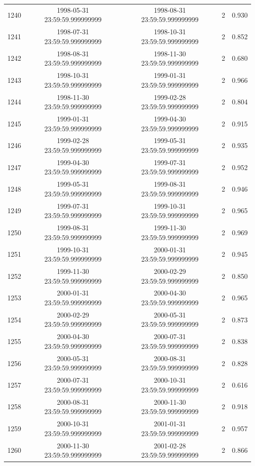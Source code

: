 \begin{table}
\begin{tabular}{lcccc}
1240 & 1998-05-31 23:59:59.999999999 & 1998-08-31 23:59:59.999999999 & 2 & 0.930 \\
1241 & 1998-07-31 23:59:59.999999999 & 1998-10-31 23:59:59.999999999 & 2 & 0.852 \\
1242 & 1998-08-31 23:59:59.999999999 & 1998-11-30 23:59:59.999999999 & 2 & 0.680 \\
1243 & 1998-10-31 23:59:59.999999999 & 1999-01-31 23:59:59.999999999 & 2 & 0.966 \\
1244 & 1998-11-30 23:59:59.999999999 & 1999-02-28 23:59:59.999999999 & 2 & 0.804 \\
1245 & 1999-01-31 23:59:59.999999999 & 1999-04-30 23:59:59.999999999 & 2 & 0.915 \\
1246 & 1999-02-28 23:59:59.999999999 & 1999-05-31 23:59:59.999999999 & 2 & 0.935 \\
1247 & 1999-04-30 23:59:59.999999999 & 1999-07-31 23:59:59.999999999 & 2 & 0.952 \\
1248 & 1999-05-31 23:59:59.999999999 & 1999-08-31 23:59:59.999999999 & 2 & 0.946 \\
1249 & 1999-07-31 23:59:59.999999999 & 1999-10-31 23:59:59.999999999 & 2 & 0.965 \\
1250 & 1999-08-31 23:59:59.999999999 & 1999-11-30 23:59:59.999999999 & 2 & 0.969 \\
1251 & 1999-10-31 23:59:59.999999999 & 2000-01-31 23:59:59.999999999 & 2 & 0.945 \\
1252 & 1999-11-30 23:59:59.999999999 & 2000-02-29 23:59:59.999999999 & 2 & 0.850 \\
1253 & 2000-01-31 23:59:59.999999999 & 2000-04-30 23:59:59.999999999 & 2 & 0.965 \\
1254 & 2000-02-29 23:59:59.999999999 & 2000-05-31 23:59:59.999999999 & 2 & 0.873 \\
1255 & 2000-04-30 23:59:59.999999999 & 2000-07-31 23:59:59.999999999 & 2 & 0.838 \\
1256 & 2000-05-31 23:59:59.999999999 & 2000-08-31 23:59:59.999999999 & 2 & 0.828 \\
1257 & 2000-07-31 23:59:59.999999999 & 2000-10-31 23:59:59.999999999 & 2 & 0.616 \\
1258 & 2000-08-31 23:59:59.999999999 & 2000-11-30 23:59:59.999999999 & 2 & 0.918 \\
1259 & 2000-10-31 23:59:59.999999999 & 2001-01-31 23:59:59.999999999 & 2 & 0.957 \\
1260 & 2000-11-30 23:59:59.999999999 & 2001-02-28 23:59:59.999999999 & 2 & 0.866 \\

\end{tabular}
\end{table}
